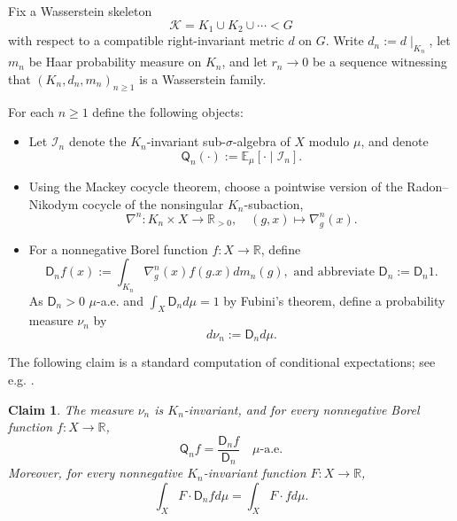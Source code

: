 \documentclass{amsart}
\numberwithin{equation}{subsection}
\theoremstyle{plain}
\theoremstyle{definition}
\theoremstyle{plain}
\newtheorem{claim}[claim]{Claim}
\begin{document}
\smallskip

Fix a Wasserstein skeleton
\[\mathcal{K}=K_{1}\cup K_{2}\cup\dotsm<G\]
with respect to a compatible right-invariant metric \(d\) on \(G\). Write \(d_{n}:=d\mid_{K_{n}}\), let \(m_{n}\) be Haar probability measure on \(K_{n}\), and let \(r_{n}\to0\) be a sequence witnessing that \(\left(K_{n},d_{n},m_{n}\right)_{n\geq 1}\) is a Wasserstein family.

\smallskip

For each \(n\geq 1\) define the following objects:
\begin{itemize}
    \item Let \(\mathcal{I}_{n}\) denote the \(K_{n}\)-invariant sub-\(\sigma\)-algebra of \(X\) modulo \(\mu\), and denote
    \[\mathsf{Q}_{n}\left(\cdot\right):=\mathbb{E}_{\mu}\left[\cdot\mid\mathcal{I}_{n}\right].\]
    \item Using the Mackey cocycle theorem, choose a pointwise version of the Radon--Nikodym cocycle of the nonsingular \(K_{n}\)-subaction,
    \[\nabla^{n}:K_{n}\times X\to\mathbb{R}_{>0},\quad\left(g,x\right)\mapsto\nabla_{g}^{n}\left(x\right).\]
    \item For a nonnegative Borel function \(f:X\to\mathbb{R}\), define
    \[\mathsf{D}_{n}f\left(x\right):=\int_{K_{n}}\nabla_{g}^{n}\left(x\right)f\left(g.x\right)dm_{n}\left(g\right),\text{ and abbreviate }\mathsf{D}_{n}:=\mathsf{D}_{n}1.\]
    As \(\mathsf{D}_{n}>0\) \(\mu\)-a.e. and \(\int_{X}\mathsf{D}_{n}d\mu=1\) by Fubini's theorem, define a probability measure \(\nu_{n}\) by
    \[d\nu_{n}:=\mathsf{D}_{n}d\mu.\]
\end{itemize}

The following claim is a standard computation of conditional expectations; see e.g. \cite[Prop.~5.1]{avraham2024uncountable}.

\begin{claim}\label{clm:compavg}
The measure \(\nu_{n}\) is \(K_{n}\)-invariant, and for every nonnegative Borel function \(f:X\to\mathbb{R}\),
\[\mathsf{Q}_{n}f=\frac{\mathsf{D}_{n}f}{\mathsf{D}_{n}}\quad\mu\text{-a.e.}\]
Moreover, for every nonnegative \(K_{n}\)-invariant function \(F:X\to\mathbb{R}\),
\begin{equation}\label{eq:FDiden}
\int_{X}F\cdot\mathsf{D}_{n}fd\mu=\int_{X}F\cdot fd\mu.
\end{equation}
\end{claim}
\end{document}
